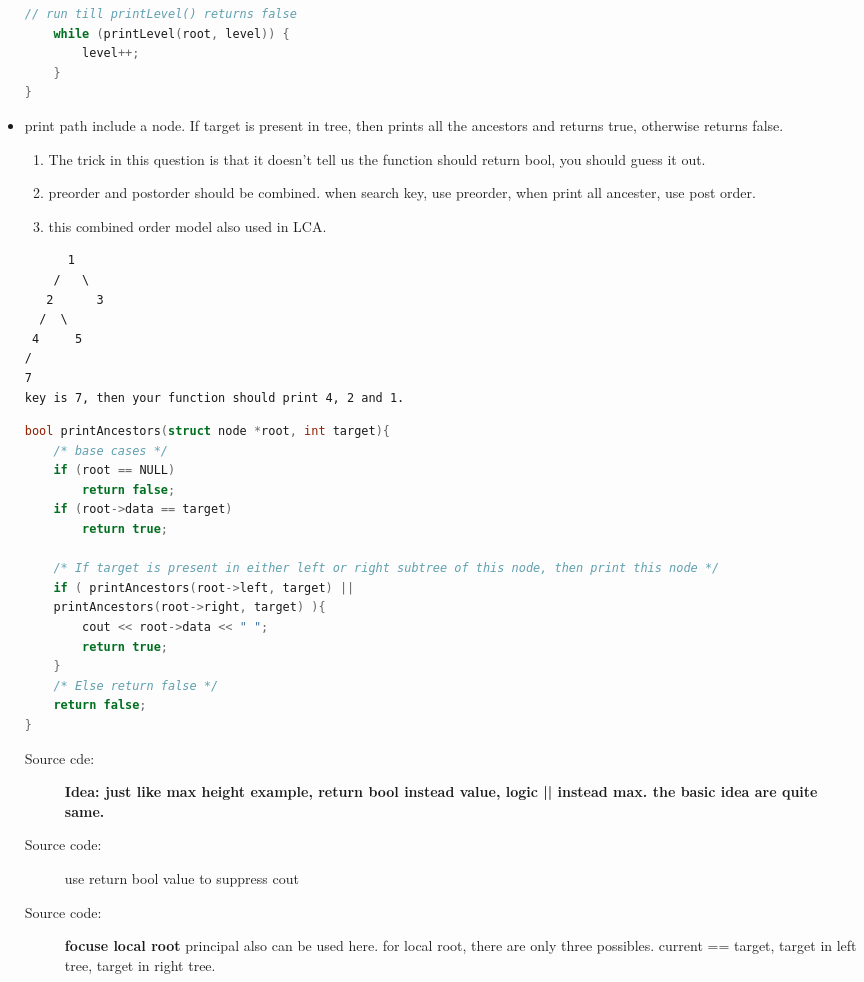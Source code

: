 \documentclass[a4paper,11pt,twoside]{book}
\begin{document}
\begin{itemize}
\begin{lstlisting}[frame=single, language=c++]
	// run till printLevel() returns false
	while (printLevel(root, level)) {
		level++;
	}
}
\end{lstlisting}

	\item print path include a node. If target is present in tree, then prints all the ancestors and returns true, otherwise returns false. 
\begin{enumerate}
	\item The trick in this question is that it doesn't tell us the function should return bool, you should guess it out.
	
	\item preorder and postorder should be combined. when search key, use preorder, when print all ancester, use post order. 
	
	\item this combined order model also used in LCA.
\end{enumerate}
\begin{verbatim}
	  1
    /   \
   2      3
  /  \
 4     5
/
7
key is 7, then your function should print 4, 2 and 1.
\end{verbatim}

\begin{lstlisting}[frame=single, language=c++]
bool printAncestors(struct node *root, int target){
	/* base cases */
	if (root == NULL)
		return false;
	if (root->data == target)
		return true;
	
	/* If target is present in either left or right subtree of this node, then print this node */
	if ( printAncestors(root->left, target) ||
	printAncestors(root->right, target) ){
		cout << root->data << " ";
		return true;
	}
	/* Else return false */
	return false;
}	
\end{lstlisting}
\begin{description}
	\item[Source cde:] \textbf{Idea: just like max height example, return bool instead value, logic || instead max. the basic idea are quite same. }
	
	\item[Source code:] use return bool value to suppress cout
	
	\item[Source code:] \textbf{focuse local root} principal also can be used here. for local root, there are only three possibles.  current == target,  target in left tree, target in right tree.    
\end{description}

\end{itemize}
\end{document}
